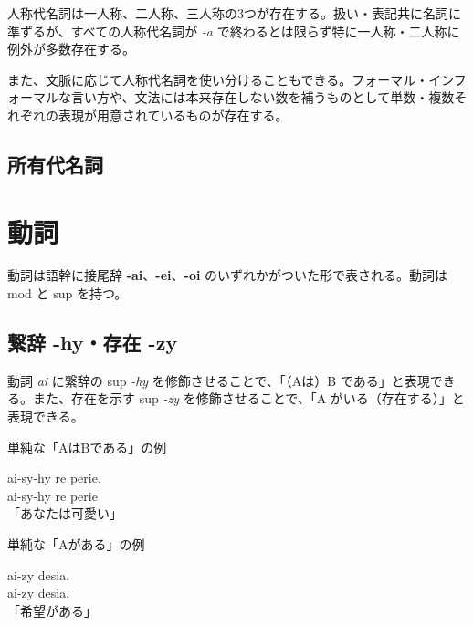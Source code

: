 人称代名詞は一人称、二人称、三人称の3つが存在する。扱い・表記共に名詞に準ずるが、すべての人称代名詞が \emph{-a} で終わるとは限らず特に一人称・二人称に例外が多数存在する。

また、文脈に応じて人称代名詞を使い分けることもできる。フォーマル・インフォーマルな言い方や、文法には本来存在しない数を補うものとして単数・複数それぞれの表現が用意されているものが存在する。

\subsection{所有代名詞}

\section{動詞}

動詞は語幹に接尾辞 \textbf{-ai}、\textbf{-ei}、\textbf{-oi} のいずれかがついた形で表される。動詞は mod と sup を持つ。

\subsection{繋辞 -hy・存在 -zy}

動詞 \emph{ai} に繋辞の sup \emph{-hy} を修飾させることで、「（Aは）B である」と表現できる。また、存在を示す sup \emph{-zy} を修飾させることで、「A がいる（存在する）」と表現できる。

\begin{itembox}[l]{単純な「AはBである」の例}
    \begin{pindent}
        \noindent
        ai-sy-hy re perie. \\
        ai-sy-hy
            re perie \\
        「あなたは可愛い」
    \end{pindent}
\end{itembox}

\begin{itembox}[l]{単純な「Aがある」の例}
    \begin{pindent}
        \noindent
        ai-zy desia. \\
        ai-zy desia.\\
        「希望がある」
    \end{pindent}
\end{itembox}

